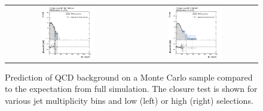 \begin{figure}[h]
\begin{tabular}{cc}
                \includegraphics[width=0.45\textwidth]{figures/MHT_JetBin4_HTlow_madgraph_DR53X_chs_TuneZ2star_pt10_withoutPUReweighting_UseRebCorrection_v1.png} &
                \includegraphics[width=0.45\textwidth]{figures/MHT_JetBin4_HThigh_madgraph_DR53X_chs_TuneZ2star_pt10_withoutPUReweighting_UseRebCorrection_v1.png}\\

  \end{tabular}
  \caption{Prediction of QCD background on a Monte Carlo sample compared to the expectation from full simulation. The closure test is shown for various jet multiplicity bins and low (left) or high (right) \HT selections.}
  \label{fig:qcd_rs_closure}
\end{figure}

